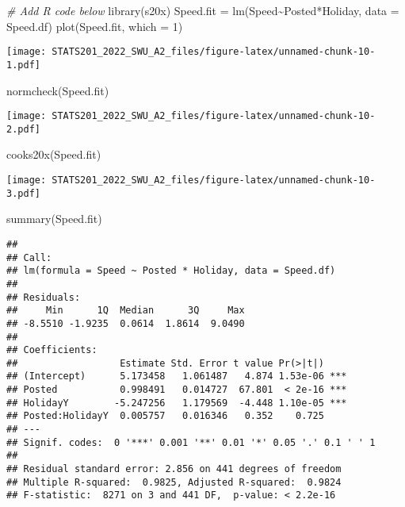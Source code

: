 \documentclass[
]{article}
\newenvironment{Shaded}{\begin{snugshade}}{\end{snugshade}}
\newcommand{\AttributeTok}[1]{\textcolor[rgb]{0.77,0.63,0.00}{#1}}
\newcommand{\CommentTok}[1]{\textcolor[rgb]{0.56,0.35,0.01}{\textit{#1}}}
\newcommand{\DecValTok}[1]{\textcolor[rgb]{0.00,0.00,0.81}{#1}}
\newcommand{\FunctionTok}[1]{\textcolor[rgb]{0.00,0.00,0.00}{#1}}
\newcommand{\NormalTok}[1]{#1}
\newcommand{\OtherTok}[1]{\textcolor[rgb]{0.56,0.35,0.01}{#1}}
\newcommand{\SpecialCharTok}[1]{\textcolor[rgb]{0.00,0.00,0.00}{#1}}
\begin{document}
\begin{Shaded}
\begin{Highlighting}[]
\CommentTok{\# Add R code below}
\FunctionTok{library}\NormalTok{(s20x)}
\NormalTok{Speed.fit }\OtherTok{=} \FunctionTok{lm}\NormalTok{(Speed}\SpecialCharTok{\textasciitilde{}}\NormalTok{Posted}\SpecialCharTok{*}\NormalTok{Holiday, }\AttributeTok{data =}\NormalTok{ Speed.df)}
\FunctionTok{plot}\NormalTok{(Speed.fit, }\AttributeTok{which =} \DecValTok{1}\NormalTok{)}
\end{Highlighting}
\end{Shaded}

\texttt{[image: STATS201\_2022\_SWU\_A2\_files/figure-latex/unnamed-chunk-10-1.pdf]}

\begin{Shaded}
\begin{Highlighting}[]
\FunctionTok{normcheck}\NormalTok{(Speed.fit)}
\end{Highlighting}
\end{Shaded}

\texttt{[image: STATS201\_2022\_SWU\_A2\_files/figure-latex/unnamed-chunk-10-2.pdf]}

\begin{Shaded}
\begin{Highlighting}[]
\FunctionTok{cooks20x}\NormalTok{(Speed.fit)}
\end{Highlighting}
\end{Shaded}

\texttt{[image: STATS201\_2022\_SWU\_A2\_files/figure-latex/unnamed-chunk-10-3.pdf]}

\begin{Shaded}
\begin{Highlighting}[]
\FunctionTok{summary}\NormalTok{(Speed.fit)}
\end{Highlighting}
\end{Shaded}

\begin{verbatim}
## 
## Call:
## lm(formula = Speed ~ Posted * Holiday, data = Speed.df)
## 
## Residuals:
##     Min      1Q  Median      3Q     Max 
## -8.5510 -1.9235  0.0614  1.8614  9.0490 
## 
## Coefficients:
##                  Estimate Std. Error t value Pr(>|t|)    
## (Intercept)      5.173458   1.061487   4.874 1.53e-06 ***
## Posted           0.998491   0.014727  67.801  < 2e-16 ***
## HolidayY        -5.247256   1.179569  -4.448 1.10e-05 ***
## Posted:HolidayY  0.005757   0.016346   0.352    0.725    
## ---
## Signif. codes:  0 '***' 0.001 '**' 0.01 '*' 0.05 '.' 0.1 ' ' 1
## 
## Residual standard error: 2.856 on 441 degrees of freedom
## Multiple R-squared:  0.9825, Adjusted R-squared:  0.9824 
## F-statistic:  8271 on 3 and 441 DF,  p-value: < 2.2e-16
\end{verbatim}
\end{document}
